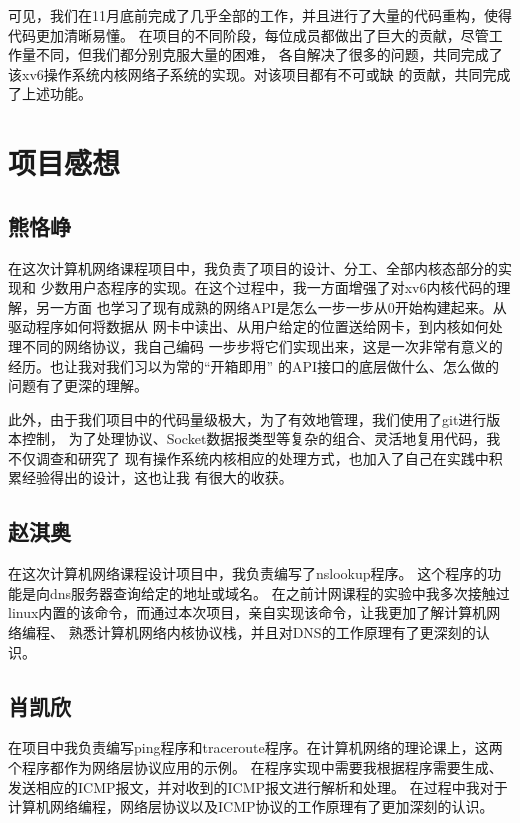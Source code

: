 \documentclass[a4paper,twoside]{ctexrep}
\begin{document}
\begin{spacing}{1.2}
可见，我们在11月底前完成了几乎全部的工作，并且进行了大量的代码重构，使得代码更加清晰易懂。
在项目的不同阶段，每位成员都做出了巨大的贡献，尽管工作量不同，但我们都分别克服大量的困难，
各自解决了很多的问题，共同完成了该xv6操作系统内核网络子系统的实现。对该项目都有不可或缺
的贡献，共同完成了上述功能。


\chapter{项目感想}

\section{熊恪峥}

在这次计算机网络课程项目中，我负责了项目的设计、分工、全部内核态部分的实现和
少数用户态程序的实现。在这个过程中，我一方面增强了对xv6内核代码的理解，另一方面
也学习了现有成熟的网络API是怎么一步一步从0开始构建起来。从驱动程序如何将数据从
网卡中读出、从用户给定的位置送给网卡，到内核如何处理不同的网络协议，我自己编码
一步步将它们实现出来，这是一次非常有意义的经历。也让我对我们习以为常的“开箱即用”
的API接口的底层做什么、怎么做的问题有了更深的理解。

此外，由于我们项目中的代码量级极大，为了有效地管理，我们使用了git进行版本控制，
为了处理协议、Socket数据报类型等复杂的组合、灵活地复用代码，我不仅调查和研究了
现有操作系统内核相应的处理方式，也加入了自己在实践中积累经验得出的设计，这也让我
有很大的收获。

\section{赵淇奥}

在这次计算机网络课程设计项目中，我负责编写了nslookup程序。
这个程序的功能是向dns服务器查询给定的地址或域名。
在之前计网课程的实验中我多次接触过linux内置的该命令，而通过本次项目，亲自实现该命令，让我更加了解计算机网络编程、
熟悉计算机网络内核协议栈，并且对DNS的工作原理有了更深刻的认识。

\section{肖凯欣}

在项目中我负责编写ping程序和traceroute程序。在计算机网络的理论课上，这两个程序都作为网络层协议应用的示例。
在程序实现中需要我根据程序需要生成、发送相应的ICMP报文，并对收到的ICMP报文进行解析和处理。
在过程中我对于计算机网络编程，网络层协议以及ICMP协议的工作原理有了更加深刻的认识。


\end{spacing}
\end{document}
